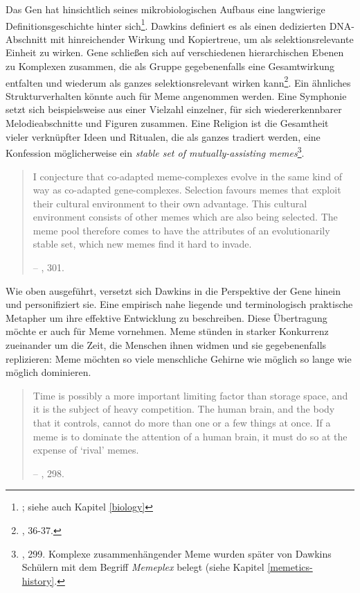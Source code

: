 \documentclass[openany,twoside,twocolumn]{book}
\let\rmarkdownfootnote\footnote%
\def\footnote{\protect\rmarkdownfootnote}
\begin{document}
Das Gen hat hinsichtlich seines mikrobiologischen Aufbaus eine
langwierige Definitionsgeschichte hinter sich\footnote{\textcite{gerstein_what_2007};
  siehe auch Kapitel \ref{biology}}. Dawkins definiert es als einen
dedizierten DNA-Abschnitt mit hinreichender Wirkung und Kopiertreue, um
als selektionsrelevante Einheit zu wirken. Gene schließen sich auf
verschiedenen hierarchischen Ebenen zu Komplexen zusammen, die als
Gruppe gegebenenfalls eine Gesamtwirkung entfalten und wiederum als
ganzes selektionsrelevant wirken kann\footnote{\textcite{Dawkinsselfishgene40th2016},
  36-37.}. Ein ähnliches Strukturverhalten könnte auch für Meme
angenommen werden. Eine Symphonie setzt sich beispielsweise aus einer
Vielzahl einzelner, für sich wiedererkennbarer Melodieabschnitte und
Figuren zusammen. Eine Religion ist die Gesamtheit vieler verknüpfter
Ideen und Ritualen, die als ganzes tradiert werden, eine Konfession
möglicherweise ein \emph{stable set of mutually-assisting
memes}\footnote{\textcite{Dawkinsselfishgene40th2016}, 299. Komplexe
  zusammenhängender Meme wurden später von Dawkins Schülern mit dem
  Begriff \emph{Memeplex} belegt (siehe Kapitel \ref{memetics-history}.}.

\begin{quote}
I conjecture that co-adapted meme-complexes evolve in the same kind of
way as co-adapted gene-complexes. Selection favours memes that exploit
their cultural environment to their own advantage. This cultural
environment consists of other memes which are also being selected. The
meme pool therefore comes to have the attributes of an evolutionarily
stable set, which new memes find it hard to invade.

-- \textcite{Dawkinsselfishgene40th2016}, 301.
\end{quote}

Wie oben ausgeführt, versetzt sich Dawkins in die Perspektive der Gene
hinein und personifiziert sie. Eine empirisch nahe liegende und
terminologisch praktische Metapher um ihre effektive Entwicklung zu
beschreiben. Diese Übertragung möchte er auch für Meme vornehmen. Meme
stünden in starker Konkurrenz zueinander um die Zeit, die Menschen ihnen
widmen und sie gegebenenfalls replizieren: Meme möchten so viele
menschliche Gehirne wie möglich so lange wie möglich dominieren.

\begin{quote}
Time is possibly a more important limiting factor than storage space,
and it is the subject of heavy competition. The human brain, and the
body that it controls, cannot do more than one or a few things at once.
If a meme is to dominate the attention of a human brain, it must do so
at the expense of `rival' memes.

-- \textcite{Dawkinsselfishgene40th2016}, 298.
\end{quote}
\end{document}

